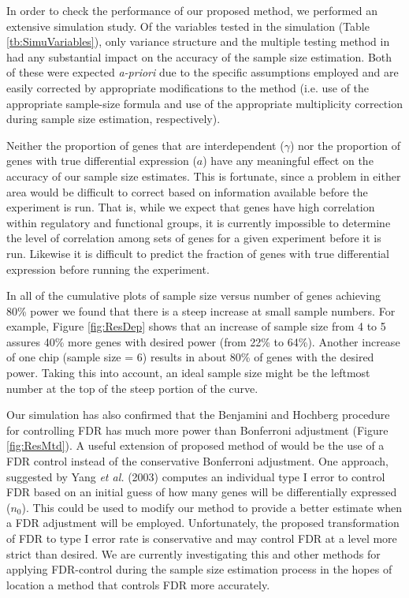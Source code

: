 \documentclass{bioinfo}
\begin{document}
In order to check the performance of our proposed method, we
performed an extensive simulation study. Of the variables tested in
the simulation (Table \ref{tb:SimuVariables}), only variance
structure and the multiple testing method in had any substantial
impact on the accuracy of the sample size estimation.  Both of these
were expected \textit{a-priori} due to the specific assumptions
employed and are easily corrected by appropriate modifications to
the method (i.e. use of the appropriate sample-size formula and use
of the appropriate multiplicity correction during sample size
estimation, respectively).

Neither the proportion of genes that are interdependent ($\gamma$)
nor the proportion of genes with true differential expression ($a$)
have any meaningful effect on the accuracy of our sample size
estimates.  This is fortunate, since a problem in either area would
be difficult to correct based on information available before the
experiment is run.  That is, while we expect that genes have high
correlation within regulatory and functional groups, it is currently
impossible to determine the level of correlation among sets of genes
for a given experiment before it is run.  Likewise it is difficult
to predict the fraction of genes with true differential expression
before running the experiment.

In all of the cumulative plots of sample size versus number of genes
achieving 80\% power we found that there is a steep increase at
small sample numbers. For example, Figure \ref{fig:ResDep} shows
that an increase of sample size from 4 to 5 assures 40\% more genes
with desired power (from 22\% to 64\%).  Another increase of one
chip (sample size = 6) results in about 80\% of genes with the desired
power. Taking this into account, an ideal sample size might be the
leftmost number at the top of the steep portion of the curve.

Our simulation has also confirmed that the Benjamini and Hochberg
procedure for controlling FDR has much more power than Bonferroni
adjustment (Figure \ref{fig:ResMtd}). A useful extension of proposed
method of would be the use of a FDR control instead of the
conservative Bonferroni adjustment. One approach, suggested by Yang
\textit{et al.} (2003) computes an individual type I error to
control FDR based on an initial guess of how many genes will be
differentially expressed ($n_0$). This could be used to modify our
method to provide a better estimate when a FDR adjustment will be
employed.  Unfortunately, the proposed transformation of FDR to type
I error rate is conservative and may control FDR at a level more
strict than desired. We are currently investigating this and other
methods for applying FDR-control during the sample size estimation
process in the hopes of location a method that controls FDR more
accurately.
\end{document}
